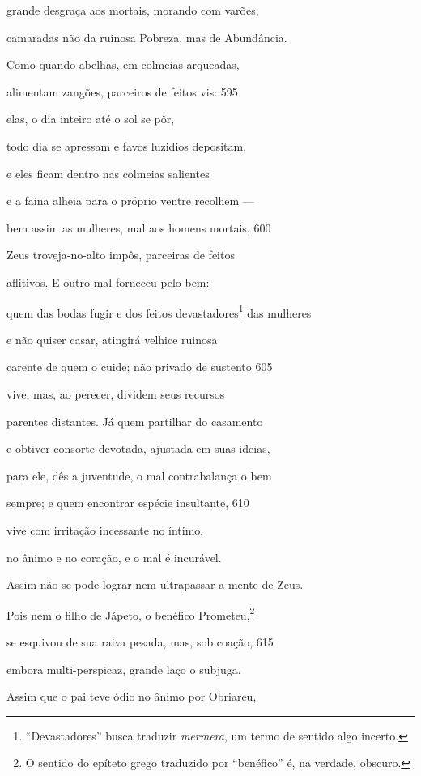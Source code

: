 grande desgraça aos mortais, morando com varões,

camaradas não da ruinosa Pobreza, mas de Abundância.

Como quando abelhas, em colmeias arqueadas,

alimentam zangões, parceiros de feitos vis: \num{595}

elas, o dia inteiro até o sol se pôr,

todo dia se apressam e favos luzidios depositam,

e eles ficam dentro nas colmeias salientes

e a faina alheia para o próprio ventre recolhem ---

bem assim as mulheres, mal aos homens mortais, \num{600}

Zeus troveja-no-alto impôs, parceiras de feitos

aflitivos. E outro mal forneceu pelo bem:

quem das bodas fugir e dos feitos devastadores\footnote{``Devastadores'' busca traduzir \emph{mermera}, um termo de sentido algo incerto.} das mulheres

e não quiser casar, atingirá velhice ruinosa

carente de quem o cuide; não privado de sustento \num{605}

vive, mas, ao perecer, dividem seus recursos

parentes distantes. Já quem partilhar do casamento

e obtiver consorte devotada, ajustada em suas ideias,

para ele, dês a juventude, o mal contrabalança o bem

sempre; e quem encontrar espécie insultante, \num{610}

vive com irritação incessante no íntimo,

no ânimo e no coração, e o mal é incurável.

\quad{}Assim não se pode lograr nem ultrapassar a mente de \qb{}Zeus.

Pois nem o filho de Jápeto, o benéfico Prometeu,\footnote{O sentido do epíteto grego traduzido por ``benéfico'' é, na verdade, obscuro.}

se esquivou de sua raiva pesada, mas, sob coação, \num{615}

embora multi-perspicaz, grande laço o subjuga.

\medskip

Assim que o pai teve ódio no ânimo por Obriareu,

